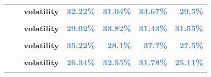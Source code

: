 \documentclass[
  authoryear,
  preprint,
  3p]{elsarticle}
\begin{document}
\begin{longtable}[t]{>{}l>{}l>{}l>{}r>{}r>{}r>{}r}
\textbf{} & \textbf{} & \textbf{volatility} & \textcolor[HTML]{4285f4}{\textbf{32.22\%}} & \textcolor[HTML]{4285f4}{\textbf{31.04\%}} & \textcolor[HTML]{4285f4}{\textbf{34.67\%}} & \textcolor[HTML]{4285f4}{\textbf{29.5\%}}\\
\textbf{\cellcolor{gray!10}{}} & \textbf{\cellcolor{gray!10}{backwardation}} & \textbf{\cellcolor{gray!10}{mean}} & \textcolor[HTML]{4285f4}{\textbf{\cellcolor{gray!10}{-5.39\%}}} & \textcolor[HTML]{4285f4}{\textbf{\cellcolor{gray!10}{7.82\%}}} & \textcolor[HTML]{4285f4}{\textbf{\cellcolor{gray!10}{7.85\%}}} & \textcolor[HTML]{4285f4}{\textbf{\cellcolor{gray!10}{2.56\%}}}\\
\textbf{} & \textbf{} & \textbf{volatility} & \textcolor[HTML]{4285f4}{\textbf{29.02\%}} & \textcolor[HTML]{4285f4}{\textbf{33.82\%}} & \textcolor[HTML]{4285f4}{\textbf{31.43\%}} & \textcolor[HTML]{4285f4}{\textbf{31.55\%}}\\
\addlinespace
\textbf{\cellcolor{gray!10}{}} & \textbf{\cellcolor{gray!10}{contango}} & \textbf{\cellcolor{gray!10}{mean}} & \textcolor[HTML]{4285f4}{\textbf{\cellcolor{gray!10}{16.95\%}}} & \textcolor[HTML]{4285f4}{\textbf{\cellcolor{gray!10}{*35.38\%}}} & \textcolor[HTML]{4285f4}{\textbf{\cellcolor{gray!10}{11.68\%}}} & \textcolor[HTML]{4285f4}{\textbf{\cellcolor{gray!10}{-3.17\%}}}\\
\textbf{} & \textbf{} & \textbf{volatility} & \textcolor[HTML]{4285f4}{\textbf{35.22\%}} & \textcolor[HTML]{4285f4}{\textbf{28.1\%}} & \textcolor[HTML]{4285f4}{\textbf{37.7\%}} & \textcolor[HTML]{4285f4}{\textbf{27.5\%}}\\
\textbf{\cellcolor{gray!10}{Soybean meal (XCBT)}} & \textbf{\cellcolor{gray!10}{whole period}} & \textbf{\cellcolor{gray!10}{mean}} & \textcolor[HTML]{4285f4}{\textbf{\cellcolor{gray!10}{7.29\%}}} & \textcolor[HTML]{4285f4}{\textbf{\cellcolor{gray!10}{12.06\%}}} & \textcolor[HTML]{4285f4}{\textbf{\cellcolor{gray!10}{8.12\%}}} & \textcolor[HTML]{4285f4}{\textbf{\cellcolor{gray!10}{-0.33\%}}}\\
\textbf{} & \textbf{} & \textbf{volatility} & \textcolor[HTML]{4285f4}{\textbf{26.34\%}} & \textcolor[HTML]{4285f4}{\textbf{32.55\%}} & \textcolor[HTML]{4285f4}{\textbf{31.78\%}} & \textcolor[HTML]{4285f4}{\textbf{25.11\%}}\\
\textbf{\cellcolor{gray!10}{}} & \textbf{\cellcolor{gray!10}{backwardation}} & \textbf{\cellcolor{gray!10}{mean}} & \textcolor[HTML]{4285f4}{\textbf{\cellcolor{gray!10}{13.15\%}}} & \textcolor[HTML]{4285f4}{\textbf{\cellcolor{gray!10}{8.22\%}}} & \textcolor[HTML]{4285f4}{\textbf{\cellcolor{gray!10}{16.04\%}}} & \textcolor[HTML]{4285f4}{\textbf{\cellcolor{gray!10}{-3.52\%}}}\\

\end{longtable}
\end{document}
